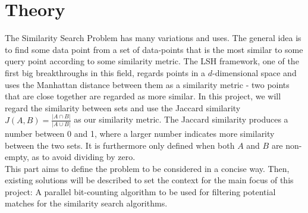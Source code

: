\section{Theory}
The Similarity Search Problem has many variations and uses. The general idea is to find some data point from a set of data-points that is the most similar to some query point according to some similarity metric. The LSH framework, one of the first big breakthroughs in this field, regards points in a $d$-dimensional space and uses the Manhattan distance between them as a similarity metric - two points that are close together are regarded as more similar\cite{classic-lsh}. In this project, we will regard the similarity between sets and use the Jaccard similarity $J(A,B)=\frac{|A\cap B|}{|A\cup B|}$ as our similarity metric. The Jaccard similarity produces a number between 0 and 1, where a larger number indicates more similarity between the two sets. It is furthermore only defined when both $A$ and $B$ are non-empty, as to avoid dividing by zero.\\
This part aims to define the problem to be considered in a concise way. Then, existing solutions will be described to set the context for the main focus of this project: A parallel bit-counting algorithm to be used for filtering potential matches for the similarity search algorithms.





